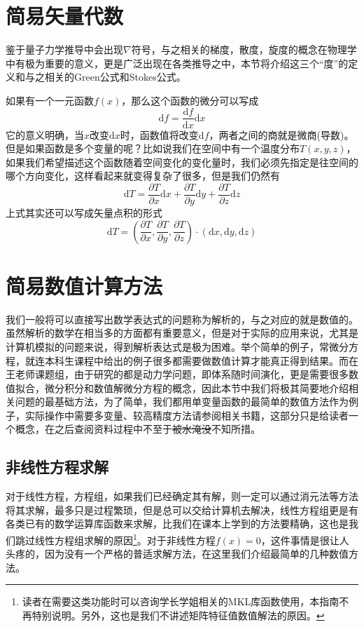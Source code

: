 \documentclass[12pt,a4paper,openany,twoside]{book}
\numberwithin{equation}{section}
\begin{document}
    \section{简易矢量代数}
    鉴于量子力学推导中会出现$\nabla$符号，与之相关的梯度，散度，旋度的概念在物理学中有极为重要的意义，更是广泛出现在各类推导之中，本节将介绍这三个“度”的定义和与之相关的Green公式和Stokes公式。

    如果有一个一元函数$f(x)$，那么这个函数的微分可以写成
    \begin{equation}
      \mathrm{d} f = \frac{\mathrm{d} f}{\mathrm{d} x} \mathrm{d}x
    \end{equation}
    它的意义明确，当$x$改变$ \mathrm{d}x $时，函数值将改变$ \mathrm{d}f $，两者之间的商就是微商(导数)。但是如果函数是多个变量的呢？比如说我们在空间中有一个温度分布$T(x,y,z)$，如果我们希望描述这个函数随着空间变化的变化量时，我们必须先指定是往空间的哪个方向变化，这样看起来就变得复杂了很多，但是我们仍然有
    \begin{equation}
      \mathrm{d}T = \frac{\partial T}{\partial x}\mathrm{d}x  +\frac{\partial T}{\partial y}\mathrm{d}y+\frac{\partial T}{\partial z}\mathrm{d}z
    \end{equation}
    上式其实还可以写成矢量点积的形式
    \begin{equation}
      \mathrm{d}T = (\frac{\partial T}{\partial x},\frac{\partial T}{\partial y},\frac{\partial T}{\partial z})\cdot(\mathrm{d}x, \mathrm{d}y, \mathrm{d}z)
    \end{equation}

    \section{简易数值计算方法}
    我们一般将可以直接写出数学表达式的问题称为解析的，与之对应的就是数值的。虽然解析的数学在相当多的方面都有重要意义，但是对于实际的应用来说，尤其是计算机模拟的问题来说，得到解析表达式是极为困难。举个简单的例子，常微分方程，就连本科生课程中给出的例子很多都需要做数值计算才能真正得到结果。而在王老师课题组，由于研究的都是动力学问题，即体系随时间演化，更是需要很多数值拟合，微分积分和数值解微分方程的概念，因此本节中我们将极其简要地介绍相关问题的最基础方法，为了简单，我们都用单变量函数的最简单的数值方法作为例子，实际操作中需要多变量、较高精度方法请参阅相关书籍，这部分只是给读者一个概念，在之后查阅资料过程中不至于\sout{被水淹没}不知所措。
    \subsection{非线性方程求解}
      对于线性方程，方程组，如果我们已经确定其有解，则一定可以通过消元法等方法将其求解，最多只是过程繁琐，但是总可以交给计算机去解决，线性方程组更是有各类已有的数学运算库函数来求解，比我们在课本上学到的方法要精确，这也是我们跳过线性方程组求解的原因\footnote{读者在需要这类功能时可以咨询学长学姐相关的MKL库函数使用，本指南不再特别说明。另外，这也是我们不讲述矩阵特征值数值解法的原因。}。对于非线性方程$f(x) = 0$，这件事情是很让人头疼的，因为没有一个严格的普适求解方法，在这里我们介绍最简单的几种数值方法。
\end{document}
